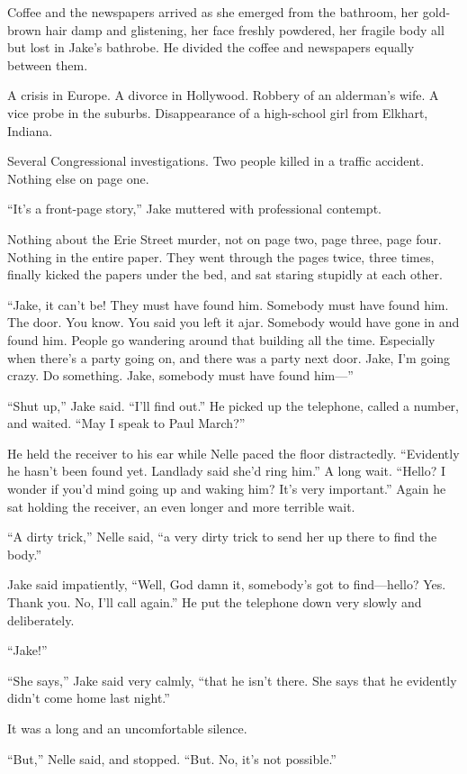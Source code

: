 \documentclass{novel}
\begin{document}
Coffee and the newspapers arrived as she emerged from the bathroom, her gold-brown hair damp and glistening, her face freshly powdered, her fragile body all but lost in Jake’s bathrobe. He divided the coffee and newspapers equally between them.

A crisis in Europe. A divorce in Hollywood. Robbery of an alderman’s wife. A vice probe in the suburbs. Disappearance of a high-school girl from Elkhart, Indiana.

Several Congressional investigations. Two people killed in a traffic accident. Nothing else on page one.

“It’s a front-page story,” Jake muttered with professional contempt.

Nothing about the Erie Street murder, not on page two, page three, page four. Nothing in the entire paper. They went through the pages twice, three times, finally kicked the papers under the bed, and sat staring stupidly at each other.

“Jake, it can’t be! They must have found him. Somebody must have found him. The door. You know. You said you left it ajar. Somebody would have gone in and found him. People go wandering around that building all the time. Especially when there’s a party going on, and there was a party next door. Jake, I’m going crazy. Do something. Jake, somebody must have found him—”

“Shut up,” Jake said. “I'll find out.” He picked up the telephone, called a number, and waited. “May I speak to Paul March?”

He held the receiver to his ear while Nelle paced the floor distractedly. “Evidently he hasn’t been found yet. Landlady said she’d ring him.” A long wait. “Hello? I wonder if you’d mind going up and waking him? It’s very important.” Again he sat holding the receiver, an even longer and more terrible wait.

“A dirty trick,” Nelle said, “a very dirty trick to send her up there to find the body.”

Jake said impatiently, “Well, God damn it, somebody’s got to find—hello? Yes. Thank you. No, I'll call again.” He put the telephone down very slowly and deliberately.

“Jake!”

“She says,” Jake said very calmly, “that he isn’t there. She says that he evidently didn’t come home last night.”

It was a long and an uncomfortable silence.

“But,” Nelle said, and stopped. “But. No, it’s not possible.”
\end{document}
